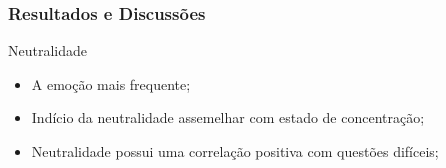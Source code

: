 \documentclass{beamer}
\begin{document}









\begin{frame}
\frametitle{Resultados e Discuss\~oes}
\begin{block}{Neutralidade}
\begin{itemize}
\pause
\item A emo\c{c}\~ao mais frequente;
\pause
\item Ind\'{i}cio da neutralidade assemelhar com estado de concentra\c{c}\~ao;
\pause
\item Neutralidade possui uma correla\c{c}\~ao positiva com quest\~oes dif\'{i}ceis;

\end{itemize}
\end{block}

\end{frame}
\end{document}
